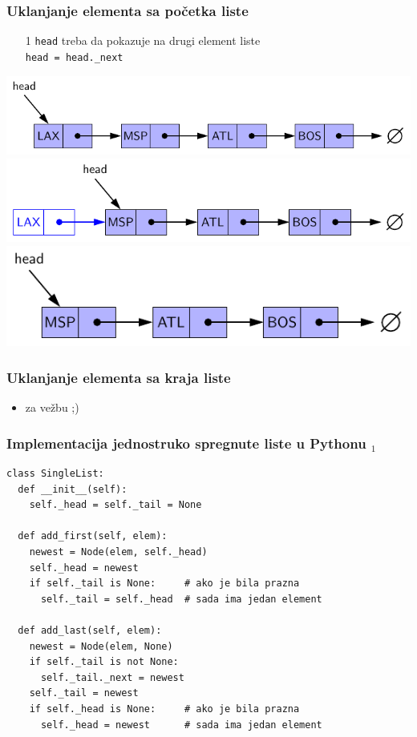 \documentclass[compress,aspectratio=169]{beamer}
\begin{document}
\begin{frame}[fragile]
  \frametitle{Uklanjanje elementa sa početka liste}
  \begin{itemize}
    \item[1] \texttt{head} treba da pokazuje na drugi element liste \\
    \texttt{head = head.\_next}
  \end{itemize}
  \begin{center}
    \includegraphics[scale=0.7]{asp-07-pic05a.pdf} \\
    \includegraphics[scale=0.7]{asp-07-pic05b.pdf} \\
    \includegraphics[scale=0.7]{asp-07-pic05c.pdf}
  \end{center}
\end{frame}

\begin{frame}[fragile]
  \frametitle{Uklanjanje elementa sa kraja liste}
  \begin{itemize}
    \item za vežbu ;)
  \end{itemize}
\end{frame}

\begin{frame}
  \frametitle{Implementacija jednostruko spregnute liste u Pythonu $_1$}
\begin{verbatim}
class SingleList:
  def __init__(self):
    self._head = self._tail = None
  
  def add_first(self, elem):
    newest = Node(elem, self._head)
    self._head = newest
    if self._tail is None:     # ako je bila prazna 
      self._tail = self._head  # sada ima jedan element
    
  def add_last(self, elem):
    newest = Node(elem, None)
    if self._tail is not None:
      self._tail._next = newest
    self._tail = newest
    if self._head is None:     # ako je bila prazna
      self._head = newest      # sada ima jedan element
\end{verbatim}
\end{frame}
\end{document}
